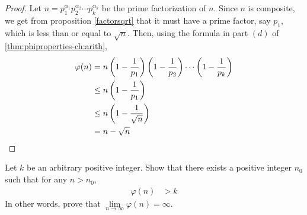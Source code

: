 	\begin{proof}
		Let $n= p_1^{\alpha_1} p_2^{\alpha_2} \cdots p_k^{\alpha_k}$ be the prime factorization of $n$. Since $n$ is composite, we get from proposition \ref{factorsqrt} that it must have a prime factor, say $p_1$, which is less than or equal to $\sqrt n$. Then, using the formula in part $(d)$ of \autoref{thm:phiproperties-ch:arith},
			\begin{align*}
				\varphi(n) &= n \left(1 - \frac{1}{p_1}\right) \left(1 - \frac{1}{p_2}\right)  \cdots \left(1 - \frac{1}{p_k}\right)\\
			   &\leq n \left(1 - \frac{1}{p_1}\right)\\
			   &\leq n \left(1 - \frac{1}{\sqrt n}\right)\\
			   &= n - \sqrt n
			\end{align*}
	\end{proof}

	\begin{theorem}
		Let $k$ be an arbitrary positive integer. Show that there exists a positive integer $n_0$ such that for any $n>n_0$,
			\begin{align*}
					\varphi(n)
						& > k
			\end{align*}
		In other words, prove that $\lim\limits_{n \to \infty} \varphi(n)= \infty$.
	\end{theorem}

